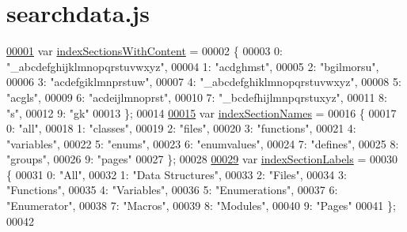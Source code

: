 \hypertarget{searchdata_8js_source}{}\section{searchdata.\+js}
\label{searchdata_8js_source}

\begin{DoxyCode}
\hypertarget{searchdata_8js_source.tex_l00001}{}\hyperlink{searchdata_8js_a6250af3c9b54dee6efc5f55f40c78126}{00001} var \hyperlink{searchdata_8js_a6250af3c9b54dee6efc5f55f40c78126}{indexSectionsWithContent} =
00002 \{
00003   0: \textcolor{stringliteral}{"\_abcdefghijklmnopqrstuvwxyz"},
00004   1: \textcolor{stringliteral}{"acdghmst"},
00005   2: \textcolor{stringliteral}{"bgilmorsu"},
00006   3: \textcolor{stringliteral}{"acdefgiklmnprstuw"},
00007   4: \textcolor{stringliteral}{"\_abcdefghiklmnopqrstuvwxyz"},
00008   5: \textcolor{stringliteral}{"acgls"},
00009   6: \textcolor{stringliteral}{"acdeijlmnoprst"},
00010   7: \textcolor{stringliteral}{"\_bcdefhijlmnpqrstuxyz"},
00011   8: \textcolor{stringliteral}{"s"},
00012   9: \textcolor{stringliteral}{"gk"}
00013 \};
00014 
\hypertarget{searchdata_8js_source.tex_l00015}{}\hyperlink{searchdata_8js_a77149ceed055c6c6ce40973b5bdc19ad}{00015} var \hyperlink{searchdata_8js_a77149ceed055c6c6ce40973b5bdc19ad}{indexSectionNames} =
00016 \{
00017   0: \textcolor{stringliteral}{"all"},
00018   1: \textcolor{stringliteral}{"classes"},
00019   2: \textcolor{stringliteral}{"files"},
00020   3: \textcolor{stringliteral}{"functions"},
00021   4: \textcolor{stringliteral}{"variables"},
00022   5: \textcolor{stringliteral}{"enums"},
00023   6: \textcolor{stringliteral}{"enumvalues"},
00024   7: \textcolor{stringliteral}{"defines"},
00025   8: \textcolor{stringliteral}{"groups"},
00026   9: \textcolor{stringliteral}{"pages"}
00027 \};
00028 
\hypertarget{searchdata_8js_source.tex_l00029}{}\hyperlink{searchdata_8js_a529972e449c82dc118cbbd3bcf50c44d}{00029} var \hyperlink{searchdata_8js_a529972e449c82dc118cbbd3bcf50c44d}{indexSectionLabels} =
00030 \{
00031   0: \textcolor{stringliteral}{"All"},
00032   1: \textcolor{stringliteral}{"Data Structures"},
00033   2: \textcolor{stringliteral}{"Files"},
00034   3: \textcolor{stringliteral}{"Functions"},
00035   4: \textcolor{stringliteral}{"Variables"},
00036   5: \textcolor{stringliteral}{"Enumerations"},
00037   6: \textcolor{stringliteral}{"Enumerator"},
00038   7: \textcolor{stringliteral}{"Macros"},
00039   8: \textcolor{stringliteral}{"Modules"},
00040   9: \textcolor{stringliteral}{"Pages"}
00041 \};
00042 
\end{DoxyCode}

